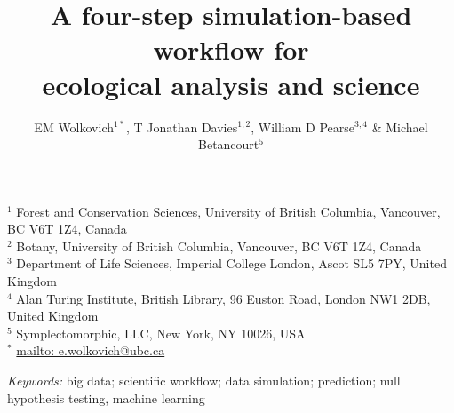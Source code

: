 \documentclass[11pt]{article}
\begin{document}

\renewcommand{\refname}{\CHead{}}


\title{A four-step simulation-based workflow for \\ecological analysis and science}
\author{EM Wolkovich$^{1*}$, T Jonathan Davies$^{1,2}$, William D Pearse$^{3,4}$ \& Michael Betancourt$^{5}$}
\maketitle

\noindent $^{1}$ Forest and Conservation Sciences, University of British Columbia, Vancouver, BC V6T 1Z4, Canada\\
$^{2}$ Botany, University of British Columbia, Vancouver, BC V6T 1Z4, Canada\\
$^{3}$ Department of Life Sciences, Imperial College London, Ascot SL5 7PY, United Kingdom \\
$^{4}$ Alan Turing Institute, British Library, 96 Euston Road, London NW1 2DB, United Kingdom \\
$^{5}$ Symplectomorphic, LLC, New York, NY 10026, USA \\
$^{*}$ \url{mailto: e.wolkovich@ubc.ca}
 
\vspace{3ex}
\noindent \emph{Keywords:} big data; scientific workflow; data simulation; prediction; null hypothesis testing, machine learning
\vspace{3ex}
\end{document}
